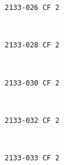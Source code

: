 \documentclass[11pt]{article}
\begin{document}
    \begin{Verbatim}[commandchars=\\\{\}]
2133-026 CF 2

    \end{Verbatim}

    \begin{center}
    \end{center}
    { \hspace*{\fill} \\}
    
    \begin{Verbatim}[commandchars=\\\{\}]
2133-028 CF 2

    \end{Verbatim}

    \begin{center}
    \end{center}
    { \hspace*{\fill} \\}
    
    \begin{Verbatim}[commandchars=\\\{\}]
2133-030 CF 2

    \end{Verbatim}

    \begin{center}
    \end{center}
    { \hspace*{\fill} \\}
    
    \begin{Verbatim}[commandchars=\\\{\}]
2133-032 CF 2

    \end{Verbatim}

    \begin{center}
    \end{center}
    { \hspace*{\fill} \\}
    
    \begin{Verbatim}[commandchars=\\\{\}]
2133-033 CF 2

    \end{Verbatim}
\end{document}
